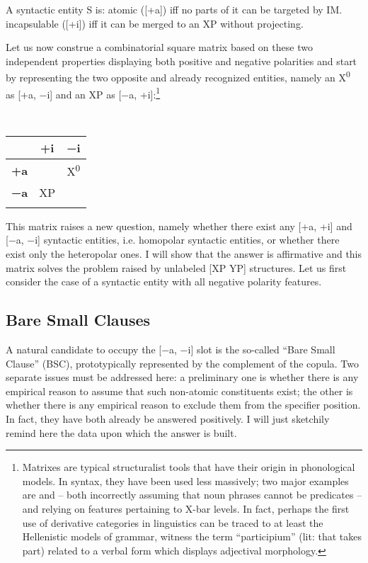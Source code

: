 \documentclass[output=paper]{langsci/langscibook}
\begin{document}
\ea A syntactic entity S is:
\label{ex:key:28.1}
	\ea atomic ([+a]) iff no parts of it can be targeted by \gls{IM}.
	\ex incapsulable ([+i]) iff it can be merged to an XP without projecting.
	\z
\z

Let us now construe a combinatorial square matrix based on these two
independent properties displaying both positive and negative polarities and
start by representing the two opposite and already recognized entities, namely
an X\textsuperscript{0} as [+a, −i] and  an XP as [−a, +i]:\footnote{Matrixes
    are typical structuralist tools that have their origin in phonological
    models.  In syntax, they have been used less massively; two major examples
    are  and \citet{Jackendoff1977} -- both incorrectly
    assuming that noun phrases cannot be predicates -- and
    \citealt{MuyskenvanRiemsdijk1986} relying on features pertaining to X-bar
    levels. In fact, perhaps the first use of derivative categories in
    linguistics can be traced to at least the Hellenistic models of grammar,
witness the term “participium” (lit: that takes part) related to a verbal form
which displays adjectival morphology.}

\ea\label{ex:key:28.2}\leavevmode\\[-1\baselineskip]
    \begin{tabular}{ccc}
    \lsptoprule
    	        & \textbf{+i} & \textbf{−i}\\
    \midrule
    \textbf{+a} &             & X\textsuperscript{0}\\
    \textbf{−a} & XP          & \\
    \lspbottomrule
    \end{tabular}
\z

This matrix raises a new question, namely whether there exist any [+a, +i] and
[−a, −i] syntactic entities, i.e. homopolar syntactic entities, or whether
there exist only the heteropolar ones. I will show that the answer is
affirmative and this matrix solves the problem raised by unlabeled [XP YP]
structures.  Let us first consider the case of a syntactic entity with all
negative polarity features.

\subsection{Bare Small Clauses}

A natural candidate to occupy the [−a, −i] slot is the so-called “Bare Small
Clause” (\gls{BSC}), prototypically represented by the complement
of the copula. Two separate issues must be addressed here: a preliminary one is
whether there is any empirical reason to assume that such non-atomic
constituents exist; the other is whether there is any empirical reason to
exclude them from the specifier position. In fact, they have both already be
answered positively.  I will just sketchily remind here the data upon which the
answer is built.\largerpage
\end{document}
